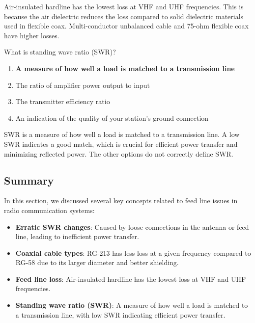 Air-insulated hardline has the lowest loss at VHF and UHF frequencies. This is because the air dielectric reduces the loss compared to solid dielectric materials used in flexible coax. Multi-conductor unbalanced cable and 75-ohm flexible coax have higher losses.


\begin{tcolorbox}[colback=gray!10!white,colframe=black!75!black,title={T9B12}]
What is standing wave ratio (SWR)?
\begin{enumerate}[label=\Alph*),noitemsep]
    \item \textbf{A measure of how well a load is matched to a transmission line}
    \item The ratio of amplifier power output to input
    \item The transmitter efficiency ratio
    \item An indication of the quality of your station’s ground connection
\end{enumerate}
\end{tcolorbox}

SWR is a measure of how well a load is matched to a transmission line. A low SWR indicates a good match, which is crucial for efficient power transfer and minimizing reflected power. The other options do not correctly define SWR.


\subsection*{Summary}
In this section, we discussed several key concepts related to feed line issues in radio communication systems:

\begin{itemize}
    \item \textbf{Erratic SWR changes}: Caused by loose connections in the antenna or feed line, leading to inefficient power transfer.
    \item \textbf{Coaxial cable types}: RG-213 has less loss at a given frequency compared to RG-58 due to its larger diameter and better shielding.
    \item \textbf{Feed line loss}: Air-insulated hardline has the lowest loss at VHF and UHF frequencies.
    \item \textbf{Standing wave ratio (SWR)}: A measure of how well a load is matched to a transmission line, with low SWR indicating efficient power transfer.
\end{itemize}

